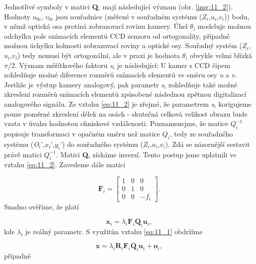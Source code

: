 Jednotlivé symboly v matici \textbf{Q}$_i$ mají následující význam (obr. \ref{img:11_2}). Hodnoty $u_{0i}$, $v_{0i}$ jsou souřadnice (měřené v souřadném systému ($Z_i$,$u_i$,$v_i$)) bodu, v němž optická osa protíná zobrazovací rovinu kamery. Úhel $\theta_i$ modeluje možnou odchylku pole snímacích elementů CCD senzoru od ortogonality, případně možnou úchylku kolmosti zobrazovací roviny a optické osy. Souřadný systém ($Z_i$,$u_i$,$v_i$) tedy nemusí být ortogonální, ale v praxi je hodnota $\theta_i$ obvykle velmi blízká $\pi$/2. Význam měřítkového faktoru \textit{s}$_i$ je následující: U kamer s CCD čipem zohledňuje možné diference rozměrů snímacích elementů ve směru osy \textit{u} a \textit{v}. Jestliže je výstup kamery analogový, pak parametr \textit{s}$_i$ zohledňuje také možné zkreslení rozměrů snímacích elementů způsobené následnou zpětnou digitalizací analogového signálu. Ze vztahu \eqref{eq:11_2} je zřejmé, že parametrem \textit{s}$_i$ korigujeme pouze poměrné zkreslení délek na osách - skutečná celková velikost obrazu bude vzata v úvahu hodnotou ohniskové vzdálenosti. Poznamenejme, že matice $Q_i^{-1}$ popisuje transformaci v opačném směru než matice $Q_i$, tedy ze souřadného systému (\textit{O}$_i$',$x_i$',$y_i$') do souřadného systému ($Z_i$,$u_i$,$v_i$). Zdá se názornější sestavit právě matici $Q_i^{-1}$. Matici \textbf{Q}$_i$ získáme inverzí. Tento postup jsme uplatnili ve vztahu \eqref{eq:11_2}. Zavedeme dále matici

\begin{equation} \label{eq:11_3}
    \mathbf{F}_{i} = \left[
    \begin{array}{ccc}
    {1} & {0} & {0} \\
    {0} & {1} & {0} \\
    {0} & {0} & {-f_{i}}
    \end{array}
    \right].  
\end{equation} 
Snadno ověříme, že platí

\begin{equation} \label{eq:11_4}
    \mathbf{x}_{i} =\lambda_{i} \mathbf{F}_{i} \mathbf{Q}_{i} \mathbf{u}_{i},
\end{equation}
kde $\lambda_{i}$ je reálný parametr. S využitím vztahu \eqref{eq:11_1} obdržíme

\begin{equation} \label{eq:11_5}
    \mathbf{x} = \lambda_{i} \mathbf{R}_{i} \mathbf{F}_{i} \mathbf{Q}_{i} \mathbf{u}_{i} + \mathbf{o}_{i},
\end{equation}
případně


